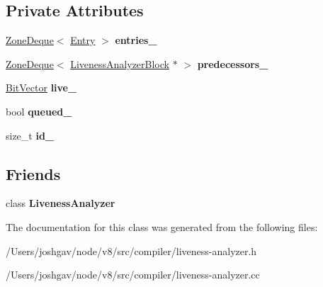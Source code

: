 \subsection*{Private Attributes}
\begin{DoxyCompactItemize}
\item 
\hyperlink{classv8_1_1internal_1_1_zone_deque}{Zone\+Deque}$<$ \hyperlink{classv8_1_1internal_1_1compiler_1_1_liveness_analyzer_block_1_1_entry}{Entry} $>$ {\bfseries entries\+\_\+}\hypertarget{classv8_1_1internal_1_1compiler_1_1_liveness_analyzer_block_adc293b7f1a15e61ab6dc0c952e533fc4}{}\label{classv8_1_1internal_1_1compiler_1_1_liveness_analyzer_block_adc293b7f1a15e61ab6dc0c952e533fc4}

\item 
\hyperlink{classv8_1_1internal_1_1_zone_deque}{Zone\+Deque}$<$ \hyperlink{classv8_1_1internal_1_1compiler_1_1_liveness_analyzer_block}{Liveness\+Analyzer\+Block} $\ast$ $>$ {\bfseries predecessors\+\_\+}\hypertarget{classv8_1_1internal_1_1compiler_1_1_liveness_analyzer_block_a06dcee6f3dc9ead4cb880c9c4a773af9}{}\label{classv8_1_1internal_1_1compiler_1_1_liveness_analyzer_block_a06dcee6f3dc9ead4cb880c9c4a773af9}

\item 
\hyperlink{classv8_1_1internal_1_1_bit_vector}{Bit\+Vector} {\bfseries live\+\_\+}\hypertarget{classv8_1_1internal_1_1compiler_1_1_liveness_analyzer_block_a73ba860a8a027bb61220294950c1b521}{}\label{classv8_1_1internal_1_1compiler_1_1_liveness_analyzer_block_a73ba860a8a027bb61220294950c1b521}

\item 
bool {\bfseries queued\+\_\+}\hypertarget{classv8_1_1internal_1_1compiler_1_1_liveness_analyzer_block_ae2908648a8b23062746e55cd275b5542}{}\label{classv8_1_1internal_1_1compiler_1_1_liveness_analyzer_block_ae2908648a8b23062746e55cd275b5542}

\item 
size\+\_\+t {\bfseries id\+\_\+}\hypertarget{classv8_1_1internal_1_1compiler_1_1_liveness_analyzer_block_a5b58375df2865e8c1cdcd2d0942bcc75}{}\label{classv8_1_1internal_1_1compiler_1_1_liveness_analyzer_block_a5b58375df2865e8c1cdcd2d0942bcc75}

\end{DoxyCompactItemize}
\subsection*{Friends}
\begin{DoxyCompactItemize}
\item 
class {\bfseries Liveness\+Analyzer}\hypertarget{classv8_1_1internal_1_1compiler_1_1_liveness_analyzer_block_ab6e18925e27032ceae0216dca5bf569e}{}\label{classv8_1_1internal_1_1compiler_1_1_liveness_analyzer_block_ab6e18925e27032ceae0216dca5bf569e}

\end{DoxyCompactItemize}


The documentation for this class was generated from the following files\+:\begin{DoxyCompactItemize}
\item 
/\+Users/joshgav/node/v8/src/compiler/liveness-\/analyzer.\+h\item 
/\+Users/joshgav/node/v8/src/compiler/liveness-\/analyzer.\+cc\end{DoxyCompactItemize}
